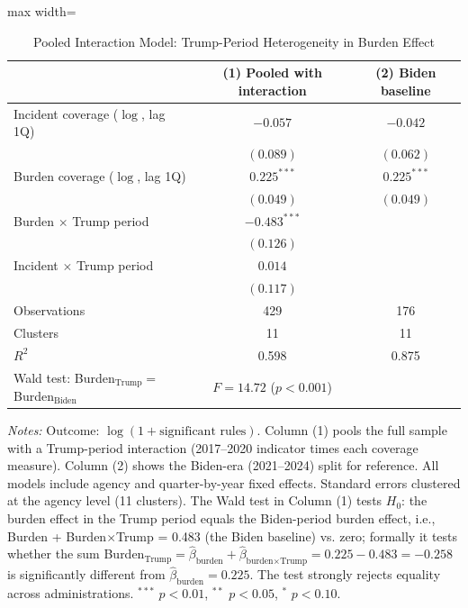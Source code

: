 \begin{table}[H]
\centering
\caption{Pooled Interaction Model: Trump-Period Heterogeneity in Burden Effect}
\label{tab:pooled_interaction}
\begin{adjustbox}{max width=\textwidth}
\begin{threeparttable}
\begin{tabular}{lcc}
\toprule
 & (1) Pooled with interaction & (2) Biden baseline \\
\midrule
Incident coverage ($\log$, lag 1Q) & $-0.057$ & $-0.042$ \\
 & $(0.089)$ & $(0.062)$ \\
Burden coverage ($\log$, lag 1Q) & $0.225^{***}$ & $0.225^{***}$ \\
 & $(0.049)$ & $(0.049)$ \\
Burden $\times$ Trump period & $-0.483^{***}$ & \\
 & $(0.126)$ & \\
Incident $\times$ Trump period & $0.014$ & \\
 & $(0.117)$ & \\
\addlinespace
Observations & 429 & 176 \\
Clusters & 11 & 11 \\
$R^2$ & 0.598 & 0.875 \\
Wald test: Burden$_{\text{Trump}} = $ Burden$_{\text{Biden}}$ & $F = 14.72$ ($p < 0.001$) & \\
\bottomrule
\end{tabular}
\begin{tablenotes}
\small
\item \textit{Notes:} Outcome: $\log(1+\text{significant rules})$. Column (1) pools the full sample with a Trump-period interaction (2017--2020 indicator times each coverage measure). Column (2) shows the Biden-era (2021--2024) split for reference. All models include agency and quarter-by-year fixed effects. Standard errors clustered at the agency level (11 clusters). The Wald test in Column (1) tests $H_0$: the burden effect in the Trump period equals the Biden-period burden effect, i.e., Burden + Burden$\times$Trump = 0.483 (the Biden baseline) vs. zero; formally it tests whether the sum Burden$_{\text{Trump}} = \hat\beta_{\text{burden}} + \hat\beta_{\text{burden} \times \text{Trump}} = 0.225 - 0.483 = -0.258$ is significantly different from $\hat\beta_{\text{burden}} = 0.225$. The test strongly rejects equality across administrations. $^{***}$ $p < 0.01$, $^{**}$ $p < 0.05$, $^{*}$ $p < 0.10$.
\end{tablenotes}
\end{threeparttable}
\end{adjustbox}
\end{table}
